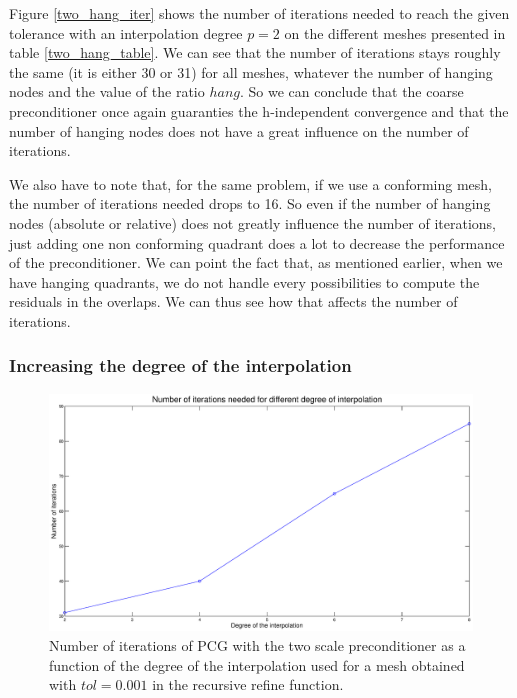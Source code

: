 Figure \ref{two_hang_iter} shows the number of iterations needed to reach the given tolerance with an interpolation degree $p=2$ on the different meshes presented in table \ref{two_hang_table}. We can see that the number of iterations stays roughly the same (it is either 30 or 31) for all meshes, whatever the number of hanging nodes and the value of the ratio $hang$. So we can conclude that the coarse preconditioner once again guaranties the h-independent convergence and that the number of hanging nodes does not have a great influence on the number of iterations. 

We also have to note that, for the same problem, if we use a conforming mesh, the number of iterations needed drops to 16. So even if the number of hanging nodes (absolute or relative) does not greatly influence the number of iterations, just adding one non conforming quadrant does a lot to decrease the performance of the preconditioner. We can point the fact that, as mentioned earlier, when we have hanging quadrants, we do not handle every possibilities to compute the residuals in the overlaps. We can thus see how that affects the number of iterations. 


\subsubsection{Increasing the degree of the interpolation}

\begin{figure}
\centering
\includegraphics[scale=0.35]{Results/two_hang_deg.eps}
\caption{Number of iterations of PCG with the two scale preconditioner as a function of the degree of the interpolation used for a mesh obtained with $tol = 0.001$ in the recursive refine function.}
\label{two_hang_deg}
\end{figure}

